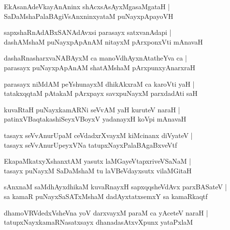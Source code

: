 \documentclass[twoside,12pt,openright]{book}
\newcounter{shloka}[chapter]
\begin{document}
\begin{shloka}%
EkAsanAdeVkayAnAninx shAcxsAsAyxMgasaMgataH |\\
SaDaMshaPalaBAgiVsAnxninxyataM puNayxpApayoVH 
\end{shloka}

\begin{shloka}%
sapxshaRnAdABxSANAdAvxsi parasayx satxvanAdapi |\\
dashAMshaM puNayxpApAnAM nitayxM pArxponxVti mAnavaH 
\end{shloka}

\begin{shloka}%
dashaRnasharxvaNABAyxM  ca manoVdhAyxnAtatheYva ca |\\
parasayx puNayxpApAnAM shatAMshaM pArxpunxyAnarxraH 
\end{shloka}

\begin{shloka}%
parasayx niMdAM peYshunayxM dhikAkxraM ca karoVti yaH |\\
tatakxqqtaM pAtakaM pArxpayx savxpuNayxM parxdadAti saH 
\end{shloka}

\begin{shloka}%
kuvaRtaH puNayxkamARNi seVvAM yaH kuruteV naraH |\\
patinxVBaqtakashiSeyxVBoyxV yadanayxH koVpi mAnavaH 
\end{shloka}

\begin{shloka}%
tasayx seVvAnurUpaM ceVdadxrXvayxM kiMcinanx diVyateV |\\
tasayx seVvAnurUpeyxVNa tatupxNayxPalaBAgaBxveVtf 
\end{shloka}

\begin{shloka}%
EkapaMkatxyXshanxtAM yasutx laMGayeVtapxriveVSaNaM |\\
tasayx puNayxM SaDaMshaM tu laVBeVdayxsutx vilaMGitaH 
\end{shloka}

\begin{shloka}%
sAnxnaM saMdhAyxdhikaM kuvaRnayxH sapxqqsheVdAvx parxBASateV |\\
sa kamaR puNayxSaSATxMshaM dadAyxtatxsemxY sa kamaRkaqtf 
\end{shloka}

\begin{shloka}%
dhamoVRVdedxVsheVna yoV darxvayxM paraM ca yAceteV naraH |\\
tatupxNayxkamaRNasatxsayx dhanadasAtxvXpunx yataPxlaM 
\end{shloka}
\end{document}

